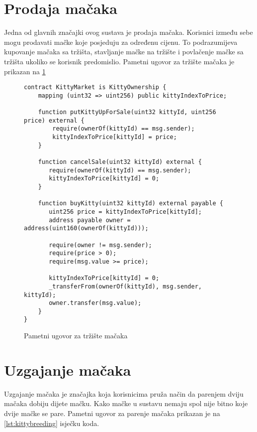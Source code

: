 \documentclass[times, utf8, tehnicka_dokumentacija]{fer}
\begin{document}
\section{Prodaja mačaka}
Jedna od glavnih značajki ovog sustava je prodaja mačaka. Korisnici između sebe mogu prodavati mačke koje posjeduju za određenu cijenu. To podrazumijeva kupovanje mačaka sa tržišta, stavljanje mačke na tržište i povlačenje mačke sa tržišta ukoliko se korisnik predomislio. Pametni ugovor za tržište mačaka je prikazan na \ref{lst:kittymarket}

\begin{figure}
\begin{lstlisting}
contract KittyMarket is KittyOwnership {
    mapping (uint32 => uint256) public kittyIndexToPrice;

    function putKittyUpForSale(uint32 kittyId, uint256 price) external {
        require(ownerOf(kittyId) == msg.sender);
        kittyIndexToPrice[kittyId] = price;
    }

    function cancelSale(uint32 kittyId) external {
       require(ownerOf(kittyId) == msg.sender);
       kittyIndexToPrice[kittyId] = 0;
    }

    function buyKitty(uint32 kittyId) external payable {
       uint256 price = kittyIndexToPrice[kittyId];
       address payable owner = address(uint160(ownerOf(kittyId)));

       require(owner != msg.sender);
       require(price > 0);
       require(msg.value >= price);

       kittyIndexToPrice[kittyId] = 0;
       _transferFrom(ownerOf(kittyId), msg.sender, kittyId);
       owner.transfer(msg.value);
    }
}
\end{lstlisting}
\caption{Pametni ugovor za tržište mačaka}
\label{lst:kittymarket}
\end{figure}

\section{Uzgajanje mačaka}
Uzgajanje mačaka je značajka koja korisnicima pruža način da parenjem dviju mačaka dobiju dijete mačku. Kako mačke u sustavu nemaju spol nije bitno koje dvije mačke se pare. Pametni ugovor za parenje mačaka prikazan je na \ref{lst:kittybreeding} isječku koda.
\end{document}
